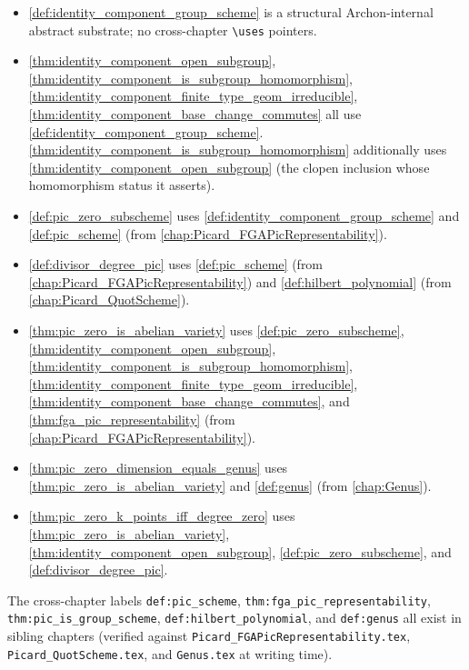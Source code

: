 \begin{itemize}
  \item \cref{def:identity_component_group_scheme} is a structural
    Archon-internal abstract substrate; no cross-chapter
    \texttt{\textbackslash uses} pointers.
  \item \cref{thm:identity_component_open_subgroup},
    \cref{thm:identity_component_is_subgroup_homomorphism},
    \cref{thm:identity_component_finite_type_geom_irreducible},
    \cref{thm:identity_component_base_change_commutes} all use
    \cref{def:identity_component_group_scheme}.
    \cref{thm:identity_component_is_subgroup_homomorphism} additionally
    uses \cref{thm:identity_component_open_subgroup} (the clopen
    inclusion whose homomorphism status it asserts).
  \item \cref{def:pic_zero_subscheme} uses
    \cref{def:identity_component_group_scheme} and
    \cref{def:pic_scheme} (from
    \cref{chap:Picard_FGAPicRepresentability}).
  \item \cref{def:divisor_degree_pic} uses \cref{def:pic_scheme}
    (from \cref{chap:Picard_FGAPicRepresentability}) and
    \cref{def:hilbert_polynomial} (from \cref{chap:Picard_QuotScheme}).
  \item \cref{thm:pic_zero_is_abelian_variety} uses
    \cref{def:pic_zero_subscheme},
    \cref{thm:identity_component_open_subgroup},
    \cref{thm:identity_component_is_subgroup_homomorphism},
    \cref{thm:identity_component_finite_type_geom_irreducible},
    \cref{thm:identity_component_base_change_commutes}, and
    \cref{thm:fga_pic_representability} (from
    \cref{chap:Picard_FGAPicRepresentability}).
  \item \cref{thm:pic_zero_dimension_equals_genus} uses
    \cref{thm:pic_zero_is_abelian_variety} and
    \cref{def:genus} (from \cref{chap:Genus}).
  \item \cref{thm:pic_zero_k_points_iff_degree_zero} uses
    \cref{thm:pic_zero_is_abelian_variety},
    \cref{thm:identity_component_open_subgroup},
    \cref{def:pic_zero_subscheme}, and
    \cref{def:divisor_degree_pic}.
\end{itemize}

The cross-chapter labels \texttt{def:pic\_scheme},
\texttt{thm:fga\_pic\_representability},
\texttt{thm:pic\_is\_group\_scheme},
\texttt{def:hilbert\_polynomial}, and \texttt{def:genus} all exist in
sibling chapters (verified against
\texttt{Picard\_FGAPicRepresentability.tex},
\texttt{Picard\_QuotScheme.tex}, and \texttt{Genus.tex} at writing
time).
